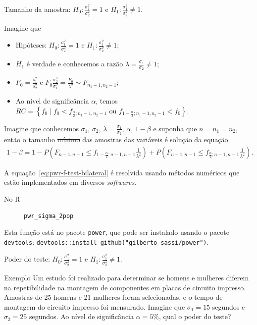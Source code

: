 \documentclass[9pt]{beamer}
\begin{document}
\begin{frame}[fragile]{Tamanho da amostra: $H_0:\frac{\sigma_1^2}{\sigma_2^2} = 1$ e $H_1:\frac{\sigma_1^2}{\sigma_2^2} \neq 1$.}
\small

Imagine que
\begin{itemize}
	\item Hipóteses: $H_0:\frac{\sigma_1^2}{\sigma_2^2} = 1$ e $H_1:\frac{\sigma_1^2}{\sigma_2^2} \neq 1$;
	\item $H_1$ é verdade e conhecemos a razão $\lambda=\frac{\sigma_1}{\sigma_2} \neq 1$;
	\item $F_0 = \frac{s_1^2}{s_2^2}$ e $F_0 \frac{\sigma_2^2}{\sigma_1^2} =  \frac{F_0}{\lambda^2} \sim F_{n_1-1, n_2-1}$;
	\item Ao nível de significância $\alpha$, temos $RC = \left\{ f_0 \mid f_0 < f_{\frac{\alpha}{2}; n_1-1, n_2-1} \mbox{ ou } f_{1-\frac{\alpha}{2}; n_1-1, n_2-1} < f_0 \right\}$.
\end{itemize}
\vfill


Imagine que conhecemos $\sigma_1$, $\sigma_2$, $\lambda = \frac{\sigma_1}{\sigma_2}$, $\alpha$, $1-\beta$ e suponha que $n=n_1=n_2$, então o tamanho \sout{mínimo} das amostras das variáveis é solução da equação
\scriptsize
\begin{align}\label{eq:pwr-f-test-bilateral}
1-\beta=1 - P \left(F_{n-1, n-1} \leq f_{1-\frac{\alpha}{2};n-1, n-1} \frac{1}{\lambda^2} \right) + P \left(F_{n-1, n-1} \leq f_{\frac{\alpha}{2};n-1, n-1} \frac{1}{\lambda^2} \right).
\end{align}


A equação~\eqref{eq:pwr-f-test-bilateral} é resolvida usando métodos numéricos que estão implementados em diversos \textit{softwares}.
\begin{description}
	\item[No R] \lstinline|pwr_sigma_2pop|
\end{description}
Esta função está no pacote \lstinline|power|, que pode ser instalado usando o pacote \lstinline|devtools|: \lstinline|devtools::install_github("gilberto-sassi/power")|.

\normalsize
\end{frame}

\begin{frame}{Poder do teste: $H_0:\frac{\sigma_1^2}{\sigma_2^2} = 1$ e $H_1:\frac{\sigma_1^2}{\sigma_2^2} \neq 1$.}

\large

\begin{block}{Exemplo}
	Um estudo foi realizado para determinar se homens e mulheres diferem na repetibilidade na montagem de componentes em placas de circuito impresso. Amostras de 25 homens e 21 mulheres foram selecionadas, e o tempo de montagem do circuito impresso foi mensurado. 
	Imagine que $\sigma_1=15$ segundos e $\sigma_2=25$ segundos. Ao nível de significância $\alpha=5\%$, qual o poder do teste?
\end{block}

\normalsize
\end{frame}
\end{document}
